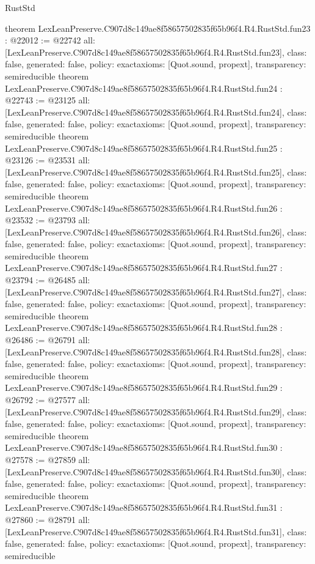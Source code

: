 \begin{lexlean}{RustStd}
\begin{coremodule}
{}
theorem LexLeanPreserve.C907d8c149ae8f58657502835f65b96f4.R4.RustStd.fun23 : @22012 := @22742 {
  all: [LexLeanPreserve.C907d8c149ae8f58657502835f65b96f4.R4.RustStd.fun23],
  class: false,
  generated: false,
  policy: exact{axioms: [Quot.sound, propext]},
  transparency: semireducible
}
theorem LexLeanPreserve.C907d8c149ae8f58657502835f65b96f4.R4.RustStd.fun24 : @22743 := @23125 {
  all: [LexLeanPreserve.C907d8c149ae8f58657502835f65b96f4.R4.RustStd.fun24],
  class: false,
  generated: false,
  policy: exact{axioms: [Quot.sound, propext]},
  transparency: semireducible
}
theorem LexLeanPreserve.C907d8c149ae8f58657502835f65b96f4.R4.RustStd.fun25 : @23126 := @23531 {
  all: [LexLeanPreserve.C907d8c149ae8f58657502835f65b96f4.R4.RustStd.fun25],
  class: false,
  generated: false,
  policy: exact{axioms: [Quot.sound, propext]},
  transparency: semireducible
}
theorem LexLeanPreserve.C907d8c149ae8f58657502835f65b96f4.R4.RustStd.fun26 : @23532 := @23793 {
  all: [LexLeanPreserve.C907d8c149ae8f58657502835f65b96f4.R4.RustStd.fun26],
  class: false,
  generated: false,
  policy: exact{axioms: [Quot.sound, propext]},
  transparency: semireducible
}
theorem LexLeanPreserve.C907d8c149ae8f58657502835f65b96f4.R4.RustStd.fun27 : @23794 := @26485 {
  all: [LexLeanPreserve.C907d8c149ae8f58657502835f65b96f4.R4.RustStd.fun27],
  class: false,
  generated: false,
  policy: exact{axioms: [Quot.sound, propext]},
  transparency: semireducible
}
theorem LexLeanPreserve.C907d8c149ae8f58657502835f65b96f4.R4.RustStd.fun28 : @26486 := @26791 {
  all: [LexLeanPreserve.C907d8c149ae8f58657502835f65b96f4.R4.RustStd.fun28],
  class: false,
  generated: false,
  policy: exact{axioms: [Quot.sound, propext]},
  transparency: semireducible
}
theorem LexLeanPreserve.C907d8c149ae8f58657502835f65b96f4.R4.RustStd.fun29 : @26792 := @27577 {
  all: [LexLeanPreserve.C907d8c149ae8f58657502835f65b96f4.R4.RustStd.fun29],
  class: false,
  generated: false,
  policy: exact{axioms: [Quot.sound, propext]},
  transparency: semireducible
}
theorem LexLeanPreserve.C907d8c149ae8f58657502835f65b96f4.R4.RustStd.fun30 : @27578 := @27859 {
  all: [LexLeanPreserve.C907d8c149ae8f58657502835f65b96f4.R4.RustStd.fun30],
  class: false,
  generated: false,
  policy: exact{axioms: [Quot.sound, propext]},
  transparency: semireducible
}
theorem LexLeanPreserve.C907d8c149ae8f58657502835f65b96f4.R4.RustStd.fun31 : @27860 := @28791 {
  all: [LexLeanPreserve.C907d8c149ae8f58657502835f65b96f4.R4.RustStd.fun31],
  class: false,
  generated: false,
  policy: exact{axioms: [Quot.sound, propext]},
  transparency: semireducible
}
\end{coremodule}
\end{lexlean}
